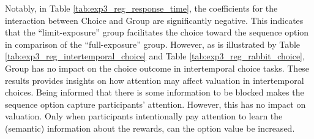 \documentclass[
  12pt,
]{article}
\begin{document}
Notably, in Table \ref{tab:exp3_reg_response_time}, the coefficients for
the interaction between Choice and Group are significantly negative.
This indicates that the ``limit-exposure'' group facilitates the choice
toward the sequence option in comparison of the ``full-exposure'' group.
However, as is illustrated by Table
\ref{tab:exp3_reg_intertemporal_choice} and Table
\ref{tab:exp3_reg_rabbit_choice}, Group has no impact on the choice
outcome in intertemporal choice tasks. These results provides insights
on how attention may affect valuation in intertemporal choices. Being
informed that there is some information to be blocked makes the sequence
option capture participants' attention. However, this has no impact on
valuation. Only when participants intentionally pay attention to learn
the (semantic) information about the rewards, can the option value be
increased.



\renewcommand\refname{Reference}
  
\end{document}
